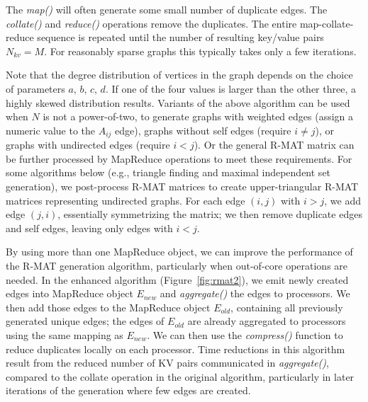 The {\it map()} will often generate some small number of duplicate edges.
The {\it collate()} and {\it reduce()} operations remove the duplicates.  The
entire map-collate-reduce sequence is repeated until the number of
resulting key/value pairs $N_{kv} = M$.  For reasonably sparse graphs
this typically takes only a few iterations.

Note that the degree distribution of vertices in the graph depends on
the choice of parameters $a$, $b$, $c$, $d$.  If one of the four
values is larger than the other three, a highly skewed distribution
results.  Variants of the above algorithm can be used when $N$ is not
a power-of-two, to generate graphs with weighted edges (assign a
numeric value to the $A_{ij}$ edge), graphs without self edges
(require $i \ne j$), or graphs with undirected edges (require $i < j$).
Or the general R-MAT matrix can be further processed by MapReduce
operations to meet these requirements.  For some algorithms below
(e.g., triangle finding and maximal independent set generation), we
post-process R-MAT matrices to create upper-triangular R-MAT
matrices representing undirected graphs.  For each edge $(i,j)$ 
with $i>j$, we add edge $(j,i)$, essentially symmetrizing the matrix; 
we then remove duplicate edges and self edges,
leaving only edges with $i<j$.

By using more than one MapReduce object, we can improve the performance
of the R-MAT generation algorithm, particularly when out-of-core operations
are needed.  In the enhanced algorithm
(Figure~\ref{fig:rmat2}), we emit newly created edges into MapReduce object
$E_{new}$ and {\it aggregate()} the edges to processors.  
We then add those edges
to the MapReduce object $E_{old}$, containing all previously generated
unique edges; the edges of $E_{old}$ are already aggregated to processors
using the same mapping as $E_{new}$.  We can then use the {\it compress()}
function to reduce duplicates locally on each processor.
Time reductions
in this algorithm result from the reduced number of KV pairs communicated in
{\it aggregate()},
compared to the collate operation in the original algorithm, 
particularly in later iterations of the generation where few
edges are created.

